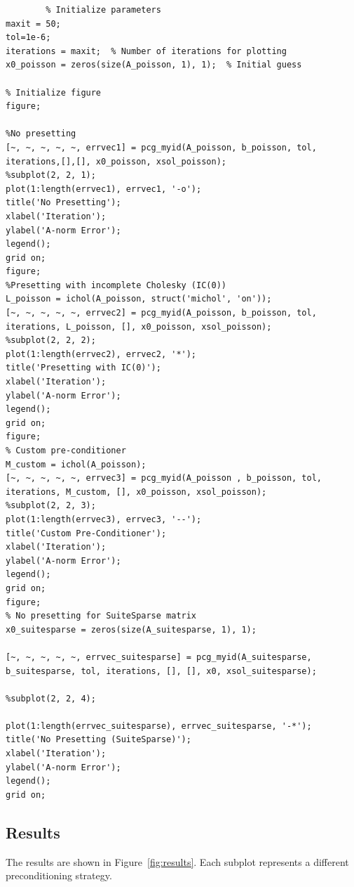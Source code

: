 \begin{center}
    \begin{lstlisting}
        % Initialize parameters
maxit = 50;
tol=1e-6;
iterations = maxit;  % Number of iterations for plotting
x0_poisson = zeros(size(A_poisson, 1), 1);  % Initial guess

% Initialize figure
figure;

%No presetting
[~, ~, ~, ~, ~, errvec1] = pcg_myid(A_poisson, b_poisson, tol, iterations,[],[], x0_poisson, xsol_poisson);
%subplot(2, 2, 1);
plot(1:length(errvec1), errvec1, '-o');
title('No Presetting');
xlabel('Iteration');
ylabel('A-norm Error');
legend();
grid on;
figure;
%Presetting with incomplete Cholesky (IC(0))
L_poisson = ichol(A_poisson, struct('michol', 'on'));
[~, ~, ~, ~, ~, errvec2] = pcg_myid(A_poisson, b_poisson, tol, iterations, L_poisson, [], x0_poisson, xsol_poisson);
%subplot(2, 2, 2);
plot(1:length(errvec2), errvec2, '*');
title('Presetting with IC(0)');
xlabel('Iteration');
ylabel('A-norm Error');
legend();
grid on;
figure;
% Custom pre-conditioner 
M_custom = ichol(A_poisson);  
[~, ~, ~, ~, ~, errvec3] = pcg_myid(A_poisson , b_poisson, tol, iterations, M_custom, [], x0_poisson, xsol_poisson);
%subplot(2, 2, 3);
plot(1:length(errvec3), errvec3, '--');
title('Custom Pre-Conditioner');
xlabel('Iteration');
ylabel('A-norm Error');
legend();
grid on;
figure;
% No presetting for SuiteSparse matrix
x0_suitesparse = zeros(size(A_suitesparse, 1), 1);

[~, ~, ~, ~, ~, errvec_suitesparse] = pcg_myid(A_suitesparse, b_suitesparse, tol, iterations, [], [], x0, xsol_suitesparse);

%subplot(2, 2, 4);

plot(1:length(errvec_suitesparse), errvec_suitesparse, '-*');
title('No Presetting (SuiteSparse)');
xlabel('Iteration');
ylabel('A-norm Error');
legend();
grid on;
    \end{lstlisting}
        
    
\end{center}
\newpage

\subsection*{Results}

The results are shown in Figure~\ref{fig:results}. Each subplot represents a different preconditioning strategy.

